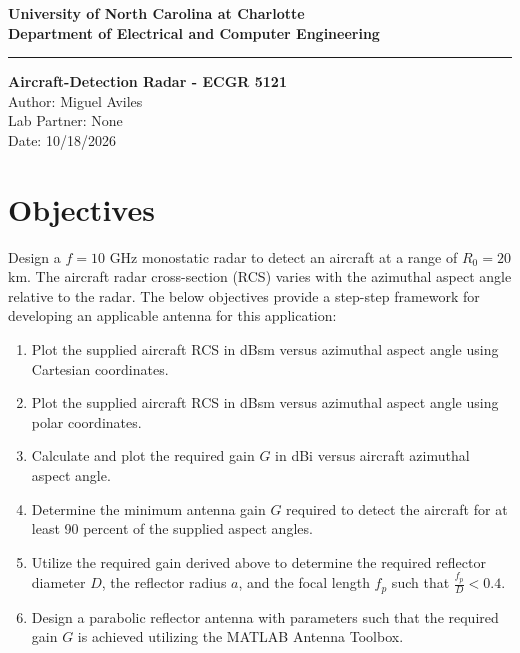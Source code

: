 \documentclass[a4paper]{article}
\begin{document}
\begin{titlepage}
	\thispagestyle{fancy} %
	\rhead{}
	\chead{}
	\rfoot{}
	\cfoot{}
	\lfoot{}
	\renewcommand{\headrulewidth}{0pt} %
	\begin{center}
		\vspace*{1cm}
		
		\Large\textbf{University of North Carolina at Charlotte \\[1pt]
			Department of Electrical and Computer Engineering} \\[2pt]
		\vspace*{1cm}
		
		\noindent\rule{15cm}{0.4pt}
		\vfill
		\LARGE\textbf{Aircraft-Detection Radar - ECGR 5121} \\ [1pt]
		\vspace{1cm}
		Author: Miguel Aviles \\
		Lab Partner: None	\\
		Date: 10/18/2026 \\
		\vspace{1.5cm}
		
		\vfill
		\vfill
	\end{center}
\end{titlepage}

\section{Objectives}
	Design a $f = 10$ GHz monostatic radar to detect an aircraft at a range of $R_0 = 20$ km. The aircraft radar cross-section (RCS) varies with the azimuthal aspect angle relative to the radar. The below objectives provide a step-step framework for developing an applicable antenna for this application:
	\begin{enumerate}
		\item Plot the supplied aircraft RCS in dBsm versus azimuthal aspect angle using Cartesian coordinates.
		\item Plot the supplied aircraft RCS in dBsm versus azimuthal aspect angle using polar coordinates.
		\item Calculate and plot the required gain $G$ in dBi versus aircraft azimuthal aspect angle.
		\item Determine the minimum antenna gain $G$ required to detect the aircraft for at least 90 percent of the supplied aspect angles.
		\item Utilize the required gain derived above to determine the required reflector diameter $D$, the reflector radius $a$, and the focal length $f_p$ such that $\frac{f_p}{D} < 0.4$.
		\item Design a parabolic reflector antenna with parameters such that the required gain $G$ is achieved utilizing the MATLAB Antenna Toolbox.
	\end{enumerate}
\end{document}
